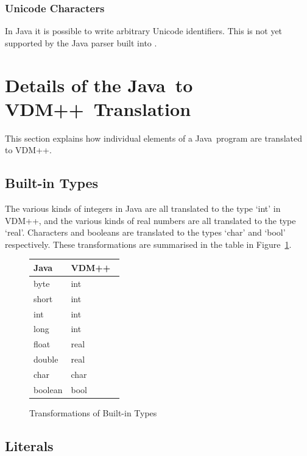 \documentclass[\pformat,12pt]{article}
\newcommand{\vdmslpp}{VDM++}
\newcommand{\JAVA}{Java}
\newcommand{\VDM}{VDM++}
\begin{document}
\subsubsection{Unicode Characters}

In Java it is possible to write arbitrary Unicode identifiers. This is
not yet supported by the Java parser built into \VDMTools.

\newpage
\section{Details of the \JAVA\ to \vdmslpp\ Translation}\label{sec:translation}

This section explains how individual elements of a \JAVA\ program are
translated to \vdmslpp.

\subsection{Built-in Types}\label{types}

The various kinds of integers in Java are all translated to the type
`int' in VDM++, and the various kinds of real numbers are all
translated to the type `real'. Characters and booleans are translated
to the types `char' and `bool' respectively. These transformations are
summarised in the table in Figure~\ref{fig:typexfs}.

\begin{figure}[htbp]
  \begin{center}
\begin{longtable}{|l|l|}
\hline
  \JAVA\   & \VDM\ \\ \hline \hline
  byte   & int \\ \hline
  short  & int \\ \hline
  int    & int \\ \hline
  long   & int \\ \hline
  float  & real \\ \hline
  double & real \\ \hline
  char  & char \\ \hline
  boolean  & bool \\ \hline
\end{longtable}    
    \caption{Transformations of Built-in Types}
    \label{fig:typexfs}
  \end{center}
\end{figure}

\subsection{Literals}\label{literals}
\end{document}
